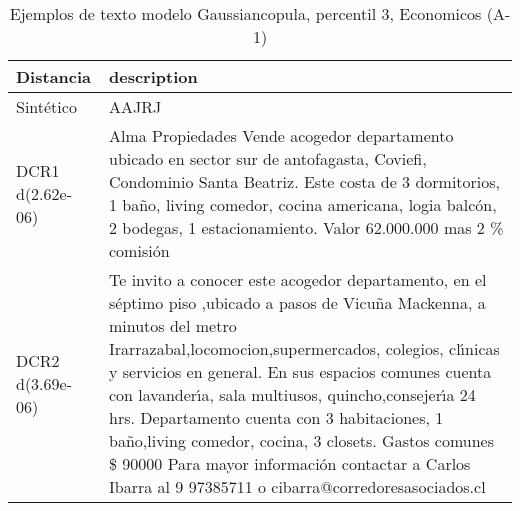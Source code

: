\begin{table}[H]
\centering
\fontsize{10}{14}\selectfont
\caption{Ejemplos de texto modelo Gaussiancopula, percentil 3, Economicos (A-1)}
\label{table-example-economicos-a-1-gaussiancopula-3p-text}
\begin{tabular}{|l|m{35em}|}
\hline
\rowcolor[gray]{0.8}
Distancia & description \\
\hline Sintético & AAJRJ \\
\hline DCR1 d(2.62e-06) & Alma Propiedades Vende acogedor departamento ubicado en sector sur de antofagasta, Coviefi, Condominio Santa Beatriz. Este costa de 3 dormitorios, 1 ba\~no, living comedor, cocina americana, logia balc\'on, 2 bodegas, 1 estacionamiento. Valor 62.000.000 mas 2 \% comisi\'on \\
\hline DCR2 d(3.69e-06) & Te invito a conocer este acogedor departamento, en el s\'eptimo piso ,ubicado a pasos de Vicu\~na Mackenna, a minutos del metro Irarrazabal,locomocion,supermercados, colegios, cl{\'\i}nicas y servicios en general.
 En sus espacios comunes cuenta con lavander{\'\i}a, sala multiusos, quincho,consejer{\'\i}a 24 hrs. Departamento cuenta con 3 habitaciones, 1 ba\~no,living comedor, cocina, 3 closets.
 Gastos comunes \$ 90000 Para mayor informaci\'on contactar a Carlos Ibarra al 9 97385711 o cibarra@corredoresasociados.cl \\
\hline
\end{tabular}
\end{table}
